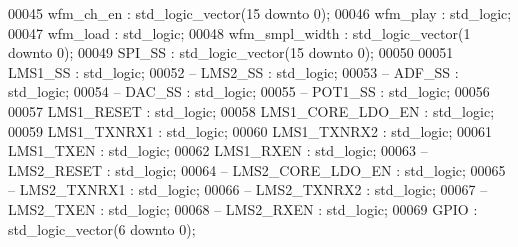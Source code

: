 \begin{DoxyCode}
00045       \textcolor{vhdlchar}{wfm_ch_en}      \textcolor{vhdlchar}{:} \textcolor{comment}{std\_logic\_vector}\textcolor{vhdlchar}{(}\textcolor{vhdllogic}{}\textcolor{vhdllogic}{15} \textcolor{keywordflow}{downto} \textcolor{vhdllogic}{}\textcolor{vhdllogic}{0}\textcolor{vhdlchar}{)};
00046       \textcolor{vhdlchar}{wfm_play}       \textcolor{vhdlchar}{:} \textcolor{comment}{std\_logic};
00047       \textcolor{vhdlchar}{wfm_load}       \textcolor{vhdlchar}{:} \textcolor{comment}{std\_logic};
00048       \textcolor{vhdlchar}{wfm_smpl_width} \textcolor{vhdlchar}{:} \textcolor{comment}{std\_logic\_vector}\textcolor{vhdlchar}{(}\textcolor{vhdllogic}{}\textcolor{vhdllogic}{1} \textcolor{keywordflow}{downto} \textcolor{vhdllogic}{}\textcolor{vhdllogic}{0}\textcolor{vhdlchar}{)};
00049       \textcolor{vhdlchar}{SPI_SS}         \textcolor{vhdlchar}{:} \textcolor{comment}{std\_logic\_vector}\textcolor{vhdlchar}{(}\textcolor{vhdllogic}{}\textcolor{vhdllogic}{15} \textcolor{keywordflow}{downto} \textcolor{vhdllogic}{}\textcolor{vhdllogic}{0}\textcolor{vhdlchar}{)};
00050       
00051       \textcolor{vhdlchar}{LMS1_SS}        \textcolor{vhdlchar}{:} \textcolor{comment}{std\_logic};
00052 \textcolor{keyword}{      -- LMS2\_SS     : std\_logic;}
00053 \textcolor{keyword}{      -- ADF\_SS      : std\_logic;}
00054 \textcolor{keyword}{      -- DAC\_SS      : std\_logic;}
00055 \textcolor{keyword}{      -- POT1\_SS     : std\_logic;}
00056       
00057       \textcolor{vhdlchar}{LMS1_RESET}        \textcolor{vhdlchar}{:} \textcolor{comment}{std\_logic};
00058       \textcolor{vhdlchar}{LMS1_CORE_LDO_EN}  \textcolor{vhdlchar}{:} \textcolor{comment}{std\_logic};
00059       \textcolor{vhdlchar}{LMS1_TXNRX1}       \textcolor{vhdlchar}{:} \textcolor{comment}{std\_logic};
00060       \textcolor{vhdlchar}{LMS1_TXNRX2}       \textcolor{vhdlchar}{:} \textcolor{comment}{std\_logic};
00061       \textcolor{vhdlchar}{LMS1_TXEN}         \textcolor{vhdlchar}{:} \textcolor{comment}{std\_logic};
00062       \textcolor{vhdlchar}{LMS1_RXEN}         \textcolor{vhdlchar}{:} \textcolor{comment}{std\_logic};
00063 \textcolor{keyword}{      -- LMS2\_RESET        : std\_logic;}
00064 \textcolor{keyword}{      -- LMS2\_CORE\_LDO\_EN  : std\_logic;}
00065 \textcolor{keyword}{      -- LMS2\_TXNRX1       : std\_logic;}
00066 \textcolor{keyword}{      -- LMS2\_TXNRX2       : std\_logic;}
00067 \textcolor{keyword}{      -- LMS2\_TXEN         : std\_logic;}
00068 \textcolor{keyword}{      -- LMS2\_RXEN         : std\_logic;}
00069       \textcolor{vhdlchar}{GPIO}              \textcolor{vhdlchar}{:} \textcolor{comment}{std\_logic\_vector}\textcolor{vhdlchar}{(}\textcolor{vhdllogic}{}\textcolor{vhdllogic}{6} \textcolor{keywordflow}{downto} \textcolor{vhdllogic}{}\textcolor{vhdllogic}{0}\textcolor{vhdlchar}{)};

\end{DoxyCode}
